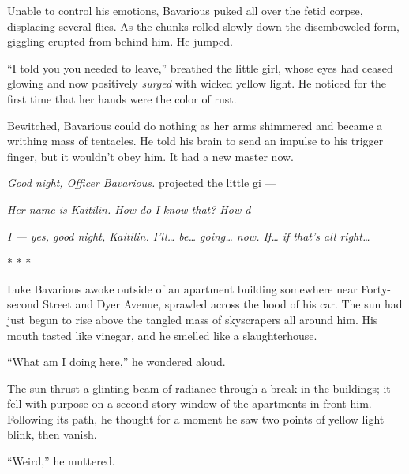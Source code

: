 Unable to control his emotions, Bavarious puked all over the fetid
corpse, displacing several flies. As the chunks rolled slowly down
the disemboweled form, giggling erupted from behind him. He
jumped.



``I told you you needed to leave,'' breathed the little girl, whose
eyes had ceased glowing and now positively {\em surged} with
wicked yellow light. He noticed for the first time that her hands
were the color of rust.



Bewitched, Bavarious could do nothing as her arms shimmered and
became a writhing mass of tentacles. He told his brain to send an
impulse to his trigger finger, but it wouldn't obey him. It had a
new master now.



{\em Good night, Officer Bavarious.} projected the little
gi ---



{\em Her name is Kaitilin. How do I know that? How d ---}



{\em I --- yes, good night, Kaitilin. I'll{\ldots} be{\ldots}
going{\ldots} now.
If{\ldots} if that's all right{\ldots}}



* * *



Luke Bavarious awoke outside of an apartment building somewhere
near Forty-second Street and Dyer Avenue, spra\-wl\-ed across the hood
of his car. The sun had just begun to rise above the tangled mass
of skyscrapers all around him. His mouth tasted like vinegar, and
he smelled like a slaughterhouse.



``What am I doing here,'' he wondered aloud.



The sun thrust a glinting beam of radiance through a break in the
buildings; it fell with purpose on a second-story window of the
apartments in front him. Following its path, he thought for a
moment he saw two points of yellow light blink, then vanish.



``Weird,'' he muttered. 
 



